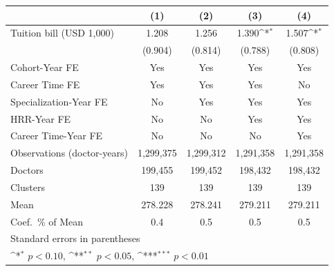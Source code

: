 {
\def\sym#1{\ifmmode^{#1}\else\(^{#1}\)\fi}
\begin{tabular}{l*{4}{c}}
\hline\hline
                    &\multicolumn{1}{c}{(1)}         &\multicolumn{1}{c}{(2)}         &\multicolumn{1}{c}{(3)}         &\multicolumn{1}{c}{(4)}         \\
\hline
Tuition bill (USD 1,000)&       1.208         &       1.256         &       1.390\sym{*}  &       1.507\sym{*}  \\
                    &     (0.904)         &     (0.814)         &     (0.788)         &     (0.808)         \\
[1em]
Cohort-Year FE      &         Yes         &         Yes         &         Yes         &         Yes         \\
[1em]
Career Time FE      &         Yes         &         Yes         &         Yes         &          No         \\
[1em]
Specialization-Year FE&          No         &         Yes         &         Yes         &         Yes         \\
[1em]
HRR-Year FE         &          No         &          No         &         Yes         &         Yes         \\
[1em]
Career Time-Year FE &          No         &          No         &          No         &         Yes         \\
\hline
Observations (doctor-years)&   1,299,375         &   1,299,312         &   1,291,358         &   1,291,358         \\
Doctors             &     199,455         &     199,452         &     198,432         &     198,432         \\
Clusters            &         139         &         139         &         139         &         139         \\
Mean                &     278.228         &     278.241         &     279.211         &     279.211         \\
Coef.\ \% of Mean   &         0.4         &         0.5         &         0.5         &         0.5         \\
\hline\hline
\multicolumn{5}{l}{\footnotesize Standard errors in parentheses}\\
\multicolumn{5}{l}{\footnotesize \sym{*} \(p<0.10\), \sym{**} \(p<0.05\), \sym{***} \(p<0.01\)}\\
\end{tabular}
}
